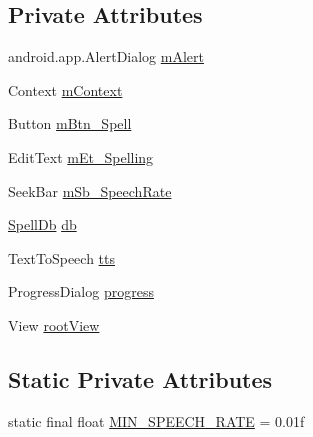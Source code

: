 \subsection*{Private Attributes}
\begin{DoxyCompactItemize}
\item 
android.\+app.\+Alert\+Dialog \hyperlink{classorg_1_1buildmlearn_1_1toolkit_1_1learnspelling_1_1fragment_1_1MainFragment_a0d2e94aabdf30dfee35b6215452ced04}{m\+Alert}
\item 
Context \hyperlink{classorg_1_1buildmlearn_1_1toolkit_1_1learnspelling_1_1fragment_1_1MainFragment_ae96ddfa8148d735c0d6ef212145b88ac}{m\+Context}
\item 
Button \hyperlink{classorg_1_1buildmlearn_1_1toolkit_1_1learnspelling_1_1fragment_1_1MainFragment_a6d5de851fd49c65a4cc56268d8dc9746}{m\+Btn\+\_\+\+Spell}
\item 
Edit\+Text \hyperlink{classorg_1_1buildmlearn_1_1toolkit_1_1learnspelling_1_1fragment_1_1MainFragment_ab008d019bf0b89cb1f5bdbf6c35675f6}{m\+Et\+\_\+\+Spelling}
\item 
Seek\+Bar \hyperlink{classorg_1_1buildmlearn_1_1toolkit_1_1learnspelling_1_1fragment_1_1MainFragment_a9d412e51e557c5b68f40e567f80dc335}{m\+Sb\+\_\+\+Speech\+Rate}
\item 
\hyperlink{classorg_1_1buildmlearn_1_1toolkit_1_1learnspelling_1_1data_1_1SpellDb}{Spell\+Db} \hyperlink{classorg_1_1buildmlearn_1_1toolkit_1_1learnspelling_1_1fragment_1_1MainFragment_ab3bc92d5024d152f132b0860541391c1}{db}
\item 
Text\+To\+Speech \hyperlink{classorg_1_1buildmlearn_1_1toolkit_1_1learnspelling_1_1fragment_1_1MainFragment_aea99947964ca03c94a307f428d5b1f07}{tts}
\item 
Progress\+Dialog \hyperlink{classorg_1_1buildmlearn_1_1toolkit_1_1learnspelling_1_1fragment_1_1MainFragment_a3af7fc0bc1b1a829e4e0892eb58647e7}{progress}
\item 
View \hyperlink{classorg_1_1buildmlearn_1_1toolkit_1_1learnspelling_1_1fragment_1_1MainFragment_a98e56c573aa586a67edbf011b7d18059}{root\+View}
\end{DoxyCompactItemize}
\subsection*{Static Private Attributes}
\begin{DoxyCompactItemize}
\item 
static final float \hyperlink{classorg_1_1buildmlearn_1_1toolkit_1_1learnspelling_1_1fragment_1_1MainFragment_a393e723163e678b95b74c30eeea335e5}{M\+I\+N\+\_\+\+S\+P\+E\+E\+C\+H\+\_\+\+R\+A\+TE} = 0.\+01f
\end{DoxyCompactItemize}


